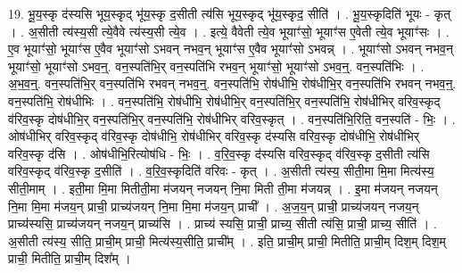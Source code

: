 \documentclass[17pt]{extarticle}
\begin{document}
19. भू॒य॒स्कृ द॑स्यसि भूय॒स्कृद् भू॑य॒स्कृ द॒सीती त्य॑सि भूय॒स्कृद् भू॑य॒स्कृद॒ सीति॑ । . भू॒य॒स्कृदिति॑ भूयः - कृत् । . अ॒सीती त्य॑स्य॒सी त्ये॒वैवे त्य॑स्य॒सी त्ये॒व । . इत्ये॒ वैवेती त्ये॒व भूयाꣳ॑सो॒ भूयाꣳ॑स ए॒वेती त्ये॒व भूयाꣳ॑सः । . ए॒व भूयाꣳ॑सो॒ भूयाꣳ॑स ए॒वैव भूयाꣳ॑सो ऽभवन् नभव॒न् भूयाꣳ॑स ए॒वैव भूयाꣳ॑सो ऽभवन्न् । . भूयाꣳ॑सो ऽभवन् नभव॒न् भूयाꣳ॑सो॒ भूयाꣳ॑सो ऽभव॒न्॒. वन॒स्पति॑भि॒र् वन॒स्पति॑भि रभव॒न् भूयाꣳ॑सो॒ भूयाꣳ॑सो ऽभव॒न्॒. वन॒स्पति॑भिः । . अ॒भ॒व॒न्॒. वन॒स्पति॑भि॒र् वन॒स्पति॑भि रभवन् नभव॒न्॒. वन॒स्पति॑भि॒ रोष॑धीभि॒ रोष॑धीभि॒र् वन॒स्पति॑भि रभवन् नभव॒न्॒. वन॒स्पति॑भि॒ रोष॑धीभिः । . वन॒स्पति॑भि॒ रोष॑धीभि॒ रोष॑धीभि॒र् वन॒स्पति॑भि॒र् वन॒स्पति॑भि॒ रोष॑धीभिर् वरिव॒स्कृद् व॑रिव॒स्कृ दोष॑धीभि॒र् वन॒स्पति॑भि॒र् वन॒स्पति॑भि॒ रोष॑धीभिर् वरिव॒स्कृत् । . वन॒स्पति॑भि॒रिति॒ वन॒स्पति॑ - भिः॒ । . ओष॑धीभिर् वरिव॒स्कृद् व॑रिव॒स्कृ दोष॑धीभि॒ रोष॑धीभिर् वरिव॒स्कृ द॑स्यसि वरिव॒स्कृ दोष॑धीभि॒ रोष॑धीभिर् वरिव॒स्कृ द॑सि । . ओष॑धीभि॒रित्योष॑धि - भिः॒ । . व॒रि॒व॒स्कृ द॑स्यसि वरिव॒स्कृद् व॑रिव॒स्कृ द॒सीती त्य॑सि वरिव॒स्कृद् व॑रिव॒स्कृ द॒सीति॑ । . व॒रि॒व॒स्कृदिति॑ वरिवः - कृत् । . अ॒सीती त्य॑स्य॒ सीती॒मा मि॒मा मित्य॑स्य॒ सीती॒माम् । . इती॒मा मि॒मा मितीती॒मा म॑जयन् नजयन् नि॒मा मिती ती॒मा म॑जयन्न् । . इ॒मा म॑जयन् नजयन् नि॒मा मि॒मा म॑जय॒न् प्राची॒ प्राच्य॑जयन् नि॒मा मि॒मा म॑जय॒न् प्राची᳚ । . अ॒ज॒य॒न् प्राची॒ प्राच्य॑जयन् नजय॒न् प्राच्य॑स्यसि॒ प्राच्य॑जयन् नजय॒न् प्राच्य॑सि । . प्राच्य॑ स्यसि॒ प्राची॒ प्राच्य॒ सीती त्य॑सि॒ प्राची॒ प्राच्य॒ सीति॑ । . अ॒सीती त्य॑स्य॒ सीति॒ प्राची॒म् प्राची॒ मित्य॑स्य॒सीति॒ प्राची᳚म् । . इति॒ प्राची॒म् प्राची॒ मितीति॒ प्राची॒म् दिश॒म् दिश॒म् प्राची॒ मितीति॒ प्राची॒म् दिश᳚म् । \newline
\end{document}
